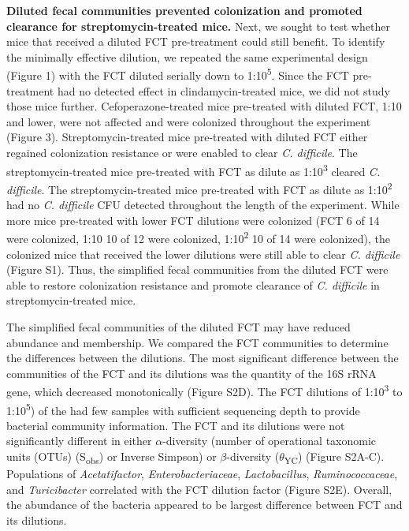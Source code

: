\documentclass[
  12pt,
]{article}
\begin{document}
\textbf{Diluted fecal communities prevented colonization and promoted
clearance for streptomycin-treated mice.} Next, we sought to test
whether mice that received a diluted FCT pre-treatment could still
benefit. To identify the minimally effective dilution, we repeated the
same experimental design (Figure 1) with the FCT diluted serially down
to 1:10\textsuperscript{5}. Since the FCT pre-treatment had no detected
effect in clindamycin-treated mice, we did not study those mice further.
Cefoperazone-treated mice pre-treated with diluted FCT, 1:10 and lower,
were not affected and were colonized throughout the experiment (Figure
3). Streptomycin-treated mice pre-treated with diluted FCT either
regained colonization resistance or were enabled to clear \emph{C.
difficile}. The streptomycin-treated mice pre-treated with FCT as dilute
as 1:10\textsuperscript{3} cleared \emph{C. difficile}. The
streptomycin-treated mice pre-treated with FCT as dilute as
1:10\textsuperscript{2} had no \emph{C. difficile} CFU detected
throughout the length of the experiment. While more mice pre-treated
with lower FCT dilutions were colonized (FCT 6 of 14 were colonized,
1:10 10 of 12 were colonized, 1:10\textsuperscript{2} 10 of 14 were
colonized), the colonized mice that received the lower dilutions were
still able to clear \emph{C. difficile} (Figure S1). Thus, the
simplified fecal communities from the diluted FCT were able to restore
colonization resistance and promote clearance of \emph{C. difficile} in
streptomycin-treated mice.

The simplified fecal communities of the diluted FCT may have reduced
abundance and membership. We compared the FCT communities to determine
the differences between the dilutions. The most significant difference
between the communities of the FCT and its dilutions was the quantity of
the 16S rRNA gene, which decreased monotonically (Figure S2D). The FCT
dilutions of 1:10\textsuperscript{3} to 1:10\textsuperscript{5}) of the
had few samples with sufficient sequencing depth to provide bacterial
community information. The FCT and its dilutions were not significantly
different in either \(\alpha\)-diversity (number of operational
taxonomic units (OTUs) (S\textsubscript{obs}) or Inverse Simpson) or
\(\beta\)-diversity (\(\theta\)\textsubscript{YC}) (Figure S2A-C).
Populations of \emph{Acetatifactor}, \emph{Enterobacteriaceae},
\emph{Lactobacillus}, \emph{Ruminococcaceae}, and \emph{Turicibacter}
correlated with the FCT dilution factor (Figure S2E). Overall, the
abundance of the bacteria appeared to be largest difference between FCT
and its dilutions.
\end{document}
